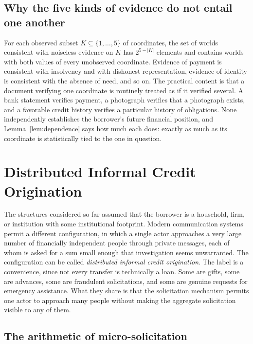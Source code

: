 \documentclass[11pt]{article}
\theoremstyle{definition}
\theoremstyle{remark}
\begin{document}
\subsection{Why the five kinds of evidence do not entail one another}

For each observed subset $K\subseteq\{1,\ldots,5\}$ of coordinates, the set of worlds consistent with noiseless evidence on $K$ has $2^{5-|K|}$ elements and contains worlds with both values of every unobserved coordinate. Evidence of payment is consistent with insolvency and with dishonest representation, evidence of identity is consistent with the absence of need, and so on. The practical content is that a document verifying one coordinate is routinely treated as if it verified several. A bank statement verifies payment, a photograph verifies that a photograph exists, and a favorable credit history verifies a particular history of obligations. None independently establishes the borrower's future financial position, and Lemma~\ref{lem:dependence} says how much each does: exactly as much as its coordinate is statistically tied to the one in question.

\section{Distributed Informal Credit Origination}\label{sec:micro}

The structures considered so far assumed that the borrower is a household, firm, or institution with some institutional footprint. Modern communication systems permit a different configuration, in which a single actor approaches a very large number of financially independent people through private messages, each of whom is asked for a sum small enough that investigation seems unwarranted. The configuration can be called \emph{distributed informal credit origination}. The label is a convenience, since not every transfer is technically a loan. Some are gifts, some are advances, some are fraudulent solicitations, and some are genuine requests for emergency assistance. What they share is that the solicitation mechanism permits one actor to approach many people without making the aggregate solicitation visible to any of them.

\subsection{The arithmetic of micro-solicitation}
\end{document}
